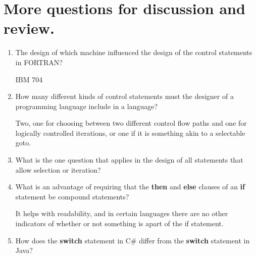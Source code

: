 \section{More questions for discussion and review.}

\begin{enumerate}
  \item The design of which machine influenced the design
    of the control statements in FORTRAN?

    \begin{answer}

    IBM 704

    \end{answer}

  \item How many different kinds of control statements
    must the designer of a programming language include
    in a language?

    \begin{answer}

    Two, one for choosing between two different control flow paths and one for logically controlled iterations, or one if it is something akin to a selectable goto.
    
    \end{answer}

  \item What is the one question that applies in the
    design of all statements that allow selection or
    iteration?

    \begin{answer}
    
    \end{answer}

  \item What is an advantage of requiring that
    the \textbf{then} and \textbf{else} clauses of
    an \textbf{if} statement be compound statements?

    \begin{answer}

    It helps with readability, and in certain languages there are no other indicators of whether or not something is apart of the if statement.
    
    \end{answer}

  \item How does the \textbf{switch} statement in C\#
    differ from the \textbf{switch} statement in Java?

    \begin{answer}


\end{answer}
\end{enumerate}
